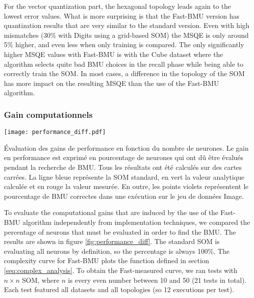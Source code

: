 	For the vector quantization part, the hexagonal topology leads again to the lowest error values. What is more surprising is that the Fast-BMU version has quantization results that are very similar to the standard version. Even with high mismatches (30\% with Digits using a grid-based SOM) the MSQE is only around 5\% higher, and even less when only training is compared. The only significantly higher MSQE values with Fast-BMU is with the Cube dataset where the algorithm selects quite bad BMU choices in the recall phase while being able to correctly train the SOM. In most cases, a difference in the topology of the SOM has more impact on the resulting MSQE than the use of the Fast-BMU algorithm. 

	\subsubsection{Gain computationnels}\label{fast:seq:gain_comput}

	\begin{figureth}
    	\centering
    	\texttt{[image: performance\_diff.pdf]}
    	\caption[Évaluation des gains de performance en fonction du nombre de neurones]{Évaluation des gains de performance en fonction du nombre de neurones. Le gain en performance est exprimé en pourcentage de neurones qui ont dû être évalués pendant la recherche de BMU. Tous les résultats ont été calculés sur des cartes carrées. La ligne bleue représente la SOM standard, en vert la valeur analytique calculée et en rouge la valeur mesurée. En outre, les points violets représentent le pourcentage de BMU correctes dans une exécution sur le jeu de données Image.}
    	\label{fig:performance_diff}
	\end{figureth}


	To evaluate the computational gains that are induced by the use of the Fast-BMU algorithm independently from implementation techniques, we compared the percentage of neurons that must be evaluated in order to find the BMU. The results are shown in figure \ref{fig:performance_diff}. The standard SOM is evaluating all neurons by definition, so the percentage is always 100\%. The complexity curve for Fast-BMU plots the function defined in section \ref{seq:complex_analysis}. To obtain the Fast-measured curve, we ran tests with $n\times n$ SOM, where $n$ is every even number between 10 and 50 (21 tests in total). Each test featured all datasets and all topologies (so 12 executions per test). 

